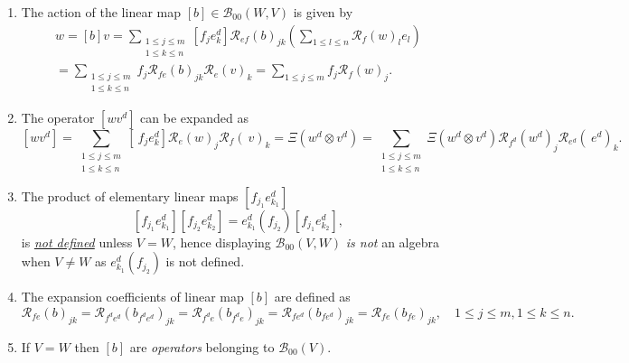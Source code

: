 \documentclass[aps,preprint]{revtex4}%
\begin{document}
\begin{enumerate}
\item The action of the linear map $\left[  b\right]  \in\mathcal{B}%
_{00}\left(  W,V\right)  $ is given by
\begin{gather}
w=\left[  b\right]  v=\sum_{\substack{1\leq j\leq m\\1\leq k\leq n}}\left[
f_{j}e_{k}^{d}\right]  \mathcal{R}_{ef}\left(  b\right)  _{jk}\left(
\sum_{1\leq l\leq n}\mathcal{R}_{f}\left(  w\right)  _{l}e_{l}\right) \\
=\sum_{\substack{1\leq j\leq m\\1\leq k\leq n}}f_{j}\mathcal{R}_{fe}\left(
b\right)  _{jk}\mathcal{R}_{e}\left(  v\right)  _{k}=\sum_{1\leq j\leq m}%
f_{j}\mathcal{R}_{f}\left(  w\right)  _{j}.
\end{gather}


\item The operator $\left[  wv^{d}\right]  $ can be expanded as
\begin{equation}
\left[  wv^{d}\right]  =\sum_{\substack{1\leq j\leq m\\1\leq k\leq n}}\left[
\ f_{j}e_{k}^{d}\right]  \mathcal{R}_{e}\left(  w\right)  _{j}\mathcal{R}%
_{f}\left(  \ v\right)  _{k}=\Xi\left(  w^{d}\otimes v^{d}\right)
=\sum_{\substack{1\leq j\leq m\\1\leq k\leq n}}\Xi\left(  w^{d}\otimes
v^{d}\right)  \mathcal{R}_{f^{d}}\left(  w^{d}\right)  _{j}\mathcal{R}_{e^{d}%
}\left(  \ e^{d}\right)  _{k}.
\end{equation}


\item The product of elementary linear maps $\left[  f_{j_{1}}e_{k_{1}}%
^{d}\right]  $%
\begin{equation}
\left[  f_{j_{1}}e_{k_{1}}^{d}\right]  \left[  f_{j_{2}}e_{k_{2}}^{d}\right]
=e_{k_{1}}^{d}\left(  f_{j_{2}}\right)  \left[  f_{j_{1}}e_{k_{2}}^{d}\right]
,
\end{equation}
is \underline{\emph{not defined}} unless $V=W$, hence displaying
$\mathcal{B}_{00}\left(  V,W\right)  $ \emph{is not} an algebra when $V\neq W$
as $e_{k_{1}}^{d}\left(  f_{j_{2}}\right)  $ is not defined.

\item The expansion coefficients of linear map $\left[  b\right]  $ are
defined as
\begin{equation}
\mathcal{R}_{fe}\left(  b\right)  _{jk}=\mathcal{R}_{f^{d}e^{d}}\left(
b_{f^{d}e^{d}}\right)  _{jk}=\mathcal{R}_{f^{d}e}\left(  b_{f^{d}e}\right)
_{jk}=\mathcal{R}_{fe^{d}}\left(  b_{fe^{d}}\right)  _{jk}=\mathcal{R}%
_{fe}\left(  b_{fe}\right)  _{jk},\quad1\leq j\leq m,1\leq k\leq n.
\end{equation}


\item If $V=W$ then $\left[  b\right]  $ are \emph{operators} belonging to
$\mathcal{B}_{00}\left(  V\right)  .$
\end{enumerate}
\end{document}
